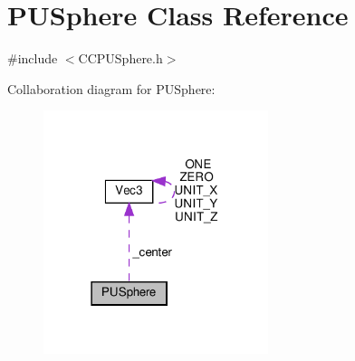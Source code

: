 \hypertarget{classPUSphere}{}\section{P\+U\+Sphere Class Reference}
\label{classPUSphere}


{\ttfamily \#include $<$C\+C\+P\+U\+Sphere.\+h$>$}



Collaboration diagram for P\+U\+Sphere\+:
\nopagebreak
\begin{figure}[H]
\begin{center}
\leavevmode
\includegraphics[width=186pt]{classPUSphere__coll__graph}
\end{center}
\end{figure}
